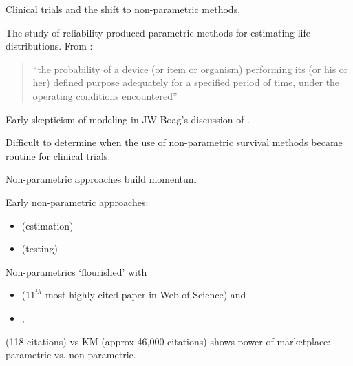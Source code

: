 \documentclass[11pt]{beamer}
\begin{document}
\begin{frame}{Clinical trials and the shift to non-parametric methods.}
    

The study of reliability produced parametric methods  for estimating life distributions.  From \cite{mann1974methodsfor}:

\begin{quote}
``the probability of a device (or item or organism) performing its (or his or her) defined purpose adequately for a specified period of time, under the operating conditions encountered''
\end{quote}

Early skepticism of modeling in JW Boag's discussion of \cite{armitage1959comparison}.

Difficult to determine when the use of non-parametric survival methods became routine for clinical trials.

	
\end{frame}
	
\begin{frame}{Non-parametric approaches build momentum}	

Early non-parametric approaches:

\begin{itemize}
	\item \cite{berkson1952survival} (estimation)
	
	\item \cite{gehan1965generalized} (testing)
\end{itemize} 

Non-parametrics `flourished' with 
\begin{itemize}
    \item \cite{1958nonpakaplanrametric} ($11^{th}$ most highly cited paper in Web of Science) and 
    
    \item \cite{mantel1966evaluation}, \cite{peto1972asymptotically} 
\end{itemize}

\cite{elveback1958estimation} (118 citations) vs KM (approx 46,000 citations) shows power of marketplace: parametric vs. non-parametric.

\end{frame}


\end{document}

